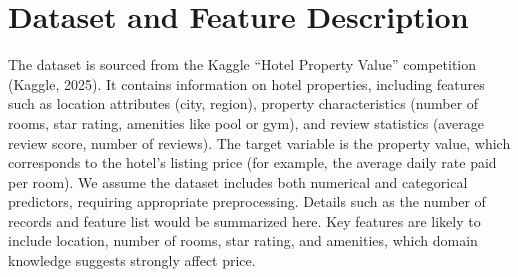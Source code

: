 \documentclass[12pt]{article}
\begin{document}
\section{Dataset and Feature Description}
The dataset is sourced from the Kaggle ``Hotel Property Value'' competition (Kaggle, 2025). It contains information on hotel properties, including features such as location attributes (city, region), property characteristics (number of rooms, star rating, amenities like pool or gym), and review statistics (average review score, number of reviews). The target variable is the property value, which corresponds to the hotel's listing price (for example, the average daily rate paid per room). We assume the dataset includes both numerical and categorical predictors, requiring appropriate preprocessing. Details such as the number of records and feature list would be summarized here. Key features are likely to include location, number of rooms, star rating, and amenities, which domain knowledge suggests strongly affect price.
\end{document}
